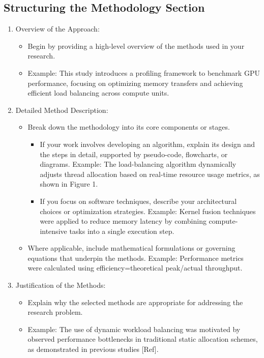 \documentclass[conference]{IEEEtran}
\begin{document}
\subsection{Structuring the Methodology Section}
\begin{enumerate}
\item Overview of the Approach:  
\begin{itemize}
   \item Begin by providing a high-level overview of the methods used in your research. 
   \item Example: This study introduces a profiling framework to benchmark GPU performance, focusing on optimizing memory transfers and achieving efficient load balancing across compute units.
\end{itemize}

\item Detailed Method Description:  
\begin{itemize}
   \item Break down the methodology into its core components or stages.  
\begin{itemize}
     \item If your work involves developing an algorithm, explain its design and the steps in detail, supported by pseudo-code, flowcharts, or diagrams. Example: The load-balancing algorithm dynamically adjusts thread allocation based on real-time resource usage metrics, as shown in Figure 1.  
     \item If you focus on software techniques, describe your architectural choices or optimization strategies. Example: Kernel fusion techniques were applied to reduce memory latency by combining compute-intensive tasks into a single execution step.  
\end{itemize}
   \item Where applicable, include mathematical formulations or governing equations that underpin the methods. Example: Performance metrics were calculated using efficiency=theoretical peak/actual throughput.
\end{itemize}

\item Justification of the Methods:  
\begin{itemize}
   \item Explain why the selected methods are appropriate for addressing the research problem.  
   \item Example: The use of dynamic workload balancing was motivated by observed performance bottlenecks in traditional static allocation schemes, as demonstrated in previous studies [Ref].
\end{itemize}
\end{enumerate}
\end{document}
